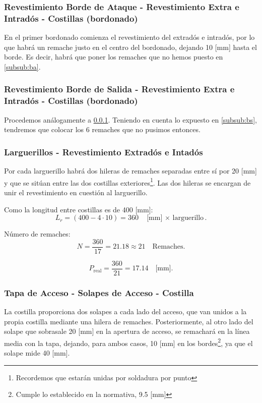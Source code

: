 \subsubsection{Revestimiento Borde de Ataque - Revestimiento Extra e Intradós - Costillas (bordonado)} \label{subsub:rba}
En el primer bordonado comienza el revestimiento del extradós e intradós, por lo que habrá un remache justo en el centro del bordonado, dejando 10 [mm] hasta el borde. Es decir, habrá que poner los remaches que no hemos puesto en \ref{subsub:ba}.


\subsubsection{Revestimiento Borde de Salida - Revestimiento Extra e Intradós - Costillas (bordonado)}
Procedemos análogamente a \ref{subsub:rba}. Teniendo en cuenta lo expuesto en \ref{subsub:bs}, tendremos que colocar los 6 remaches que no pusimos entonces.

\subsubsection{Larguerillos - Revestimiento Extradós e Intadós}
Por cada larguerillo habrá dos hileras de remaches separadas entre sí por 20 [mm] y que se sitúan entre las dos costillas exteriores\footnote{Recordemos que estarán unidas por soldadura por punto}. Las dos hileras se encargan de unir el revestimiento en cuestión al larguerillo. 

Como la longitud entre costillas es de 400 [mm]:
\begin{equation}
    L_r = (400 - 4 \cdot 10) = 360 \quad \text{[mm] $\times$ larguerillo}.
\end{equation}

Número de remaches:
\begin{equation}
    N = \dfrac{360}{17} = 21.18 \approx 21 \quad \text{Remaches}.
\end{equation}

\begin{equation}
    P_{\text{real}} = \dfrac{360}{21} = 17.14 \quad \text{[mm]}.
\end{equation}

\subsubsection{Tapa de Acceso - Solapes de Acceso - Costilla}
La costilla proporciona dos solapes a cada lado del acceso, que van unidos a la propia costilla mediante una hilera de remaches. Posteriormente, al otro lado del solape que sobrasale 20 [mm] en la apertura de acceso, se remachará en la línea media con la tapa, dejando, para ambos casos, 10 [mm] en los bordes\footnote{Cumple lo establecido en la normativa, 9.5 [mm]}, ya que el solape mide 40 [mm].

